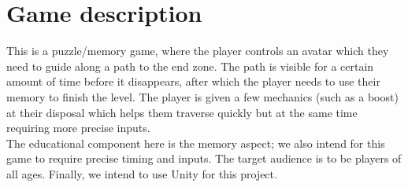 \documentclass[11pt]{article}
\begin{document}
\maketitle

\section{Game description}


This is a puzzle/memory game, where the player controls an avatar which they need to guide along a path to the end zone. The path is visible for a certain amount of time before it disappears, after which the player needs to use their memory to finish the level. The player is given a few mechanics (such as a boost) at their disposal which helps them traverse quickly but at the same time requiring more precise inputs.\\

The educational component here is the memory aspect; we also intend for this game to require precise timing and inputs. The target audience is to be players of all ages. Finally, we intend to use Unity for this project.
\end{document}
